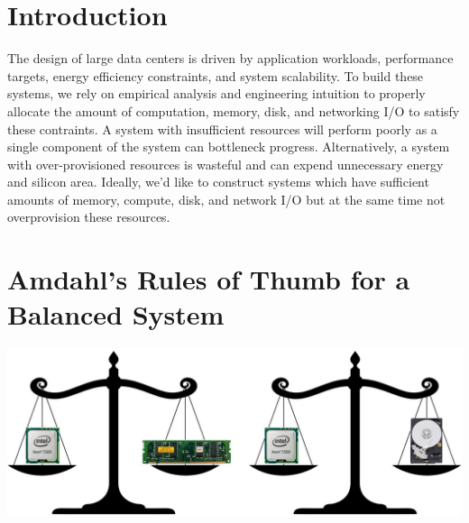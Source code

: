 \documentclass[a0,portrait]{a0poster}
\begin{document}
\vspace{1cm} %


\begin{multicols}{2} %


\color{Navy} %

\section{Introduction}

The design of large data centers is driven by application workloads, performance targets, energy efficiency constraints, and system scalability.
To build these systems, we rely on empirical analysis and engineering intuition to properly allocate the amount of computation, memory, disk, and networking I/O to satisfy these contraints.
A system with insufficient resources will perform poorly as a single component of the system can bottleneck progress.
Alternatively, a system with over-provisioned resources is wasteful and can expend unnecessary energy and silicon area.
Ideally, we'd like to construct systems which have sufficient amounts of memory, compute, disk, and network I/O but at the same time not overprovision these resources.



\section*{Amdahl's Rules of Thumb for a Balanced System}

\begin{center}\vspace{1cm}
\includegraphics[width=0.8\linewidth]{balance_fig.jpg}
\end{center}\vspace{1cm}


\end{multicols}
\end{document}
